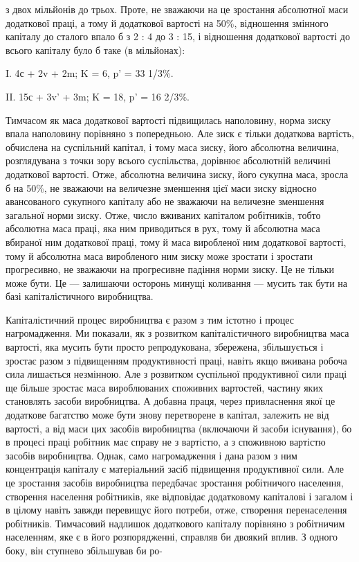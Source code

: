 з двох мільйонів до трьох. Проте, не зважаючи на це зростання
абсолютної маси додаткової праці, а тому й додаткової
вартості на 50\%, відношення змінного капіталу до сталого
впало б з 2 : 4 до 3 : 15, і відношення додаткової вартості до
всього капіталу було б таке (в мільйонах):

I. 4с + 2v + 2m; K = 6, p' = 33 1/3\%.

II. 15с + 3v' + 3m; K = 18, p' = 16 2/3\%.

Тимчасом як маса додаткової вартості підвищилась наполовину,
норма зиску впала наполовину порівняно з попередньою.
Але зиск є тільки додаткова вартість, обчислена на суспільний
капітал, і тому маса зиску, його абсолютна величина, розглядувана
з точки зору всього суспільства, дорівнює абсолютній величині
додаткової вартості. Отже, абсолютна величина зиску, його
сукупна маса, зросла б на 50\%, не зважаючи на величезне зменшення
цієї маси зиску відносно авансованого сукупного капіталу
або не зважаючи на величезне зменшення загальної норми зиску.
Отже, число вживаних капіталом робітників, тобто абсолютна
маса праці, яка ним приводиться в рух, тому й абсолютна маса
вбираної ним додаткової праці, тому й маса виробленої ним додаткової
вартості, тому й абсолютна маса виробленого ним зиску
може зростати і зростати прогресивно, не зважаючи на прогресивне
падіння норми зиску. Це не тільки може бути. Це — залишаючи
осторонь минущі коливання — мусить так бути на базі
капіталістичного виробництва.

Капіталістичний процес виробництва є разом з тим істотно і
процес нагромадження. Ми показали, як з розвитком капіталістичного
виробництва маса вартості, яка мусить бути просто
репродукована, збережена, збільшується і зростає разом з
підвищенням продуктивності праці, навіть якщо вживана робоча
сила лишається незмінною. Але з розвитком суспільної продуктивної
сили праці ще більше зростає маса вироблюваних споживних
вартостей, частину яких становлять засоби виробництва.
А добавна праця, через привласнення якої це додаткове багатство
може бути знову перетворене в капітал, залежить не від вартості,
а від маси цих засобів виробництва (включаючи й засоби
існування), бо в процесі праці робітник має справу не з вартістю,
а з споживною вартістю засобів виробництва. Однак, само
нагромадження і дана разом з ним концентрація капіталу є
матеріальний засіб підвищення продуктивної сили. Але це зростання
засобів виробництва передбачає зростання робітничого
населення, створення населення робітників, яке відповідає додатковому
капіталові і загалом і в цілому навіть завжди перевищує
його потреби, отже, створення перенаселення робітників.
Тимчасовий надлишок додаткового капіталу порівняно з робітничим
населенням, яке є в його розпорядженні, справляв би
двоякий вплив. З одного боку, він ступнево збільшував би ро-

